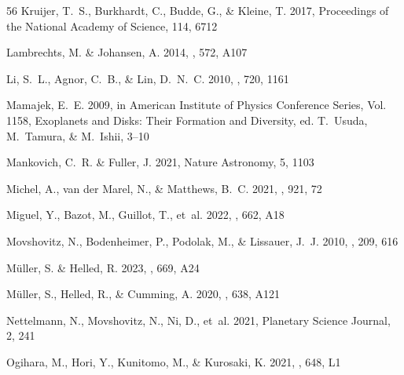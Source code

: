 \documentclass{aa}
\begin{document}
{\begin{thebibliography}{56}
{Kruijer}, T.~S., {Burkhardt}, C., {Budde}, G., \& {Kleine}, T. 2017,
  Proceedings of the National Academy of Science, 114, 6712

{Lambrechts}, M. \& {Johansen}, A. 2014, \aap, 572, A107

{Li}, S.~L., {Agnor}, C.~B., \& {Lin}, D.~N.~C. 2010, \apj, 720, 1161

{Mamajek}, E.~E. 2009, in American Institute of Physics Conference Series, Vol.
  1158, Exoplanets and Disks: Their Formation and Diversity, ed. T.~{Usuda},
  M.~{Tamura}, \& M.~{Ishii}, 3--10

{Mankovich}, C.~R. \& {Fuller}, J. 2021, Nature Astronomy, 5, 1103

{Michel}, A., {van der Marel}, N., \& {Matthews}, B.~C. 2021, \apj, 921, 72

{Miguel}, Y., {Bazot}, M., {Guillot}, T., {et~al.} 2022, \aap, 662, A18

{Movshovitz}, N., {Bodenheimer}, P., {Podolak}, M., \& {Lissauer}, J.~J. 2010,
  \icarus, 209, 616

{M{\"u}ller}, S. \& {Helled}, R. 2023, \aap, 669, A24

{M{\"u}ller}, S., {Helled}, R., \& {Cumming}, A. 2020, \aap, 638, A121

{Nettelmann}, N., {Movshovitz}, N., {Ni}, D., {et~al.} 2021, Planetary Science
  Journal, 2, 241

{Ogihara}, M., {Hori}, Y., {Kunitomo}, M., \& {Kurosaki}, K. 2021, \aap, 648,
  L1


\end{thebibliography}}
\end{document}
